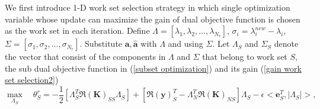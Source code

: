 \documentclass[12pt, draftclsnofoot, onecolumn]{IEEEtran}
\begin{document}
\begin{spacing}{2}
  We first introduce 1-D work set selection strategy in which single optimization variable whose update can maximize the gain of dual objective function is chosen as the work set in each iteration. Define $\Lambda=[\lambda_{1}, \lambda_{2}, \ldots, \lambda_{N_{r}}]$, $\sigma_{i}=\lambda_{i}^{new}-\lambda_{i}$, $\Sigma=[\sigma_{1}, \sigma_{2}, \ldots, \sigma_{N_{r}}]$. Substitute $\mathbf{a}, \hat{\mathbf{a}}$ with $\Lambda$ and using $\Sigma$. Let $\Lambda_{S}$ and $\Sigma_{S}$ denote the vector that consist of the components in $\Lambda$ and $\Sigma$ that belong to work set $S$, the sub dual objective function in (\ref{subset optimization}) and its gain (\ref{gain work set selection2})
  \begin{equation}
\max_{\Lambda_{S}}\quad \theta_{S}^{r}=-\frac{1}{2}[\Lambda_{S}^{T}\Re{(\mathbf{K})}_{SS}\Lambda_{S}]+[\Re{(\mathbf{y})}_{S}^{T}-\Lambda_{N}^{T}\Re{(\mathbf{K})}_{NS}
]\Lambda_{S}-\epsilon<\mathbf{e}_{S}^{T}, |\Lambda_{S}|>,
\label{subset optimization lambda}
\end{equation}


\end{spacing}
\end{document}
